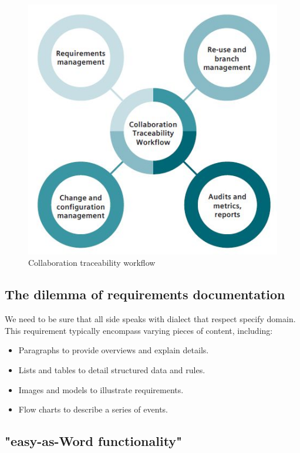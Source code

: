 \documentclass[thesis=M,english]{FITthesis}[2012/06/26]
\begin{document}
\begin{figure}[h!]\centering
	\includegraphics[width=1\textwidth]{pictures/collaboration_workflow}
	\caption{Collaboration traceability workflow \cite{polarion_alm}}\label{fig:collaboration_workflow}
\end{figure}

\subsection{The dilemma of requirements documentation}

We need to be sure that all side speaks with dialect that respect specify domain. This requirement typically encompass varying pieces of content, including:
\begin{itemize}[nosep]
	\item Paragraphs to provide overviews and explain details.
	\item Lists and tables to detail structured data and rules.
	\item Images and models to illustrate requirements.
	\item Flow charts to describe a series of events.
\end{itemize}

\subsection{"easy-as-Word functionality"}
\end{document}
